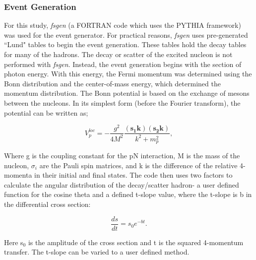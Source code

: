 \documentclass[prb,10pt,twocolumn,tightenlines,superscriptaddress]{revtex4-1}
\begin{document}
\subsubsection{Event Generation}
For this study, \textit{fsgen} (a FORTRAN code which uses the PYTHIA framework) was used for the event generator. For practical reasons, \textit{fsgen} uses pre-generated ``Lund" tables to begin the event generation. These tables hold the decay tables for many of the hadrons. The decay or scatter of the excited nucleon is not performed with \textit{fsgen}. Instead, the event generation begins with the section of photon energy. With this energy, the Fermi momentum was determined using the Bonn distribution and the center-of-mass energy, which determined the momentum distribution. The Bonn potential is based on the exchange of mesons between the nucleons\cite{ref13}. In its simplest form (before the Fourier transform), the potential can be written as;

\vspace{5mm} %
\begin{equation} 
V^{loc}_p=-\frac{g^2}{4M^2}\frac{\left({{\mathbf s}}_{{\mathbf 1}}{\mathbf k}\right)\left({{\mathbf s}}_{{\mathbf 2}}{\mathbf k}\right)}{k^2+m^2_p}  ,  \label{EQ3}      
\end{equation} 
\vspace{5mm} %

\noindent Where g is the coupling constant for the pN interaction, M is the mass of the nucleon, $\sigma{}_{i}$ are the Pauli spin matrices, and k is the difference of the relative 4-momenta in their initial and final states. The code then uses two factors to calculate the angular distribution of the decay/scatter hadron- a user defined function for the cosine theta and a defined t-slope value, where the t-slope is b in the differential cross section:

\vspace{5mm} %
\begin{equation} 
\frac{ds}{dt}=s_{0}e^{-bt} .     \label{EQ4}  
\end{equation} 
\vspace{5mm} %

\noindent Here s${}_{0}$ is the amplitude of the cross section and t is the squared 4-momentum transfer. The t-slope can be varied to a user defined method.

\FloatBarrier
\end{document}
